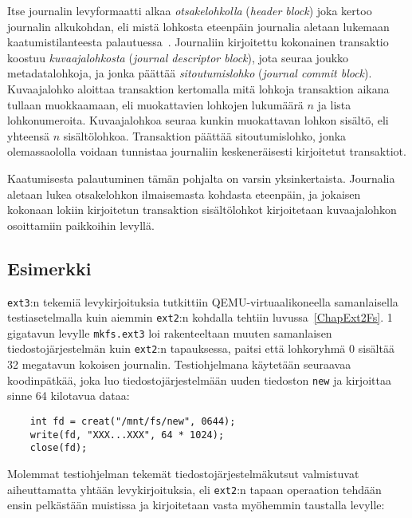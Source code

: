Itse journalin levyformaatti alkaa \emph{otsakelohkolla} (\emph{header block}) joka kertoo journalin alkukohdan,
eli mistä lohkosta eteenpäin journalia aletaan lukemaan kaatumistilanteesta palautuessa~\cite{JournalingAnalysis}.
Journaliin kirjoitettu kokonainen transaktio koostuu \emph{kuvaajalohkosta} (\emph{journal descriptor block}),
jota seuraa joukko metadatalohkoja,
ja jonka päättää \emph{sitoutumislohko} (\emph{journal commit block}).
Kuvaajalohko aloittaa transaktion kertomalla mitä lohkoja transaktion aikana tullaan muokkaamaan,
eli muokattavien lohkojen lukumäärä $n$ ja lista lohkonumeroita.
Kuvaajalohkoa seuraa kunkin muokattavan lohkon sisältö, eli yhteensä $n$ sisältölohkoa.
Transaktion päättää sitoutumislohko,
jonka olemassaololla voidaan tunnistaa journaliin keskeneräisesti kirjoitetut transaktiot.

Kaatumisesta palautuminen tämän pohjalta on varsin yksinkertaista.
Journalia aletaan lukea otsakelohkon ilmaisemasta kohdasta eteenpäin,
ja jokaisen kokonaan lokiin kirjoitetun transaktion sisältölohkot kirjoitetaan kuvaajalohkon osoittamiin paikkoihin levyllä.

\subsection{Esimerkki}
\texttt{ext3}:n tekemiä levykirjoituksia tutkittiin QEMU-virtuaalikoneella samanlaisella testiasetelmalla kuin aiemmin \texttt{ext2}:n kohdalla tehtiin luvussa~\ref{ChapExt2Fs}.
1 gigatavun levylle \texttt{mkfs.ext3} loi rakenteeltaan muuten samanlaisen tiedostojärjestelmän kuin \texttt{ext2}:n tapauksessa,
paitsi että lohkoryhmä 0 sisältää 32 megatavun kokoisen journalin.
Testiohjelmana käytetään seuraavaa koodinpätkää,
joka luo tiedostojärjestelmään uuden tiedoston \texttt{new} ja kirjoittaa sinne 64 kilotavua dataa:
%
\begin{verbatim}
    int fd = creat("/mnt/fs/new", 0644);
    write(fd, "XXX...XXX", 64 * 1024);
    close(fd);
\end{verbatim}
%
Molemmat testiohjelman tekemät tiedostojärjestelmäkutsut valmistuvat aiheuttamatta yhtään levykirjoituksia,
eli \texttt{ext2}:n tapaan operaation tehdään ensin pelkästään muistissa ja kirjoitetaan vasta myöhemmin taustalla levylle:

